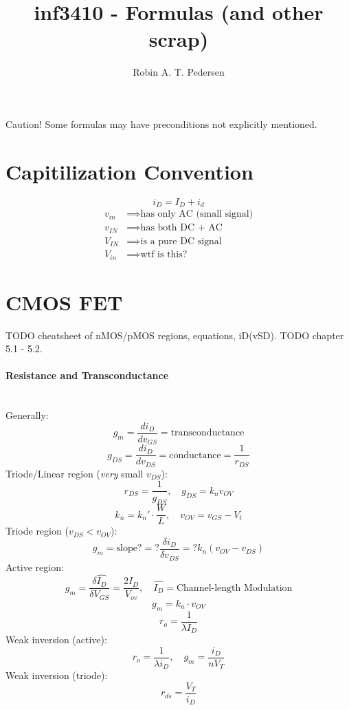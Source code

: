 \documentclass[twocolumn]{article}
\begin{document}
  \title{inf3410 - Formulas (and other scrap)}
  \author{Robin A. T. Pedersen}
  \maketitle

  Caution! Some formulas may have preconditions not explicitly mentioned.

  \section{Capitilization Convention}
    $$i_D = I_D + i_d$$
    \begin{align}
      v_{in} &\implies \text{has only AC (small signal)} \\
      v_{IN} &\implies \text{has both DC + AC} \\
      V_{IN} &\implies \text{is a pure DC signal} \\
      V_{in} &\implies \text{wtf is this?}
    \end{align}

  \section{CMOS FET}
    TODO cheatsheet of nMOS/pMOS regions, equations, iD(vSD).
    TODO chapter 5.1 - 5.2.

    \paragraph{Resistance and Transconductance} \hfill \\
      Generally:
        $$g_m = \frac{d i_D}{d v_{GS}} = \text{transconductance}$$
        $$g_{DS} = \frac{d i_D}{d v_{DS}} = \text{conductance}
          = \frac{1}{r_{DS}}$$
      Triode/Linear region (\emph{very} small $v_{DS}$):
        $$r_{DS} = \frac{1}{g_{DS}}
          ,\quad
          g_{DS} = k_n v_{OV}
          $$
        $$k_n = k_n' \cdot \frac{W}{L}
          ,\quad
          v_{OV} = v_{GS} - V_t
          $$
      Triode region ($v_{DS} < v_{OV}$):
        $$g_m = \text{slope?}
          = ?\frac{\delta i_D}{\delta v_{DS}}
          = ? k_n (v_{OV} - v_{DS})
          $$
      Active region:
        $$g_m = \frac{\delta \hat{I_D}}{\delta V_{GS}} = \frac{2 I_D}{V_{ov}}
          ,\quad \hat{I_D} = \text{Channel-length Modulation}
          $$
        $$g_m = k_n \cdot v_{OV}$$
        $$r_o = \frac{1}{\lambda I_D}$$
      Weak inversion (active):
        $$r_o = \frac{1}{\lambda i_D}
          ,\quad
          g_m = \frac{i_D}{n V_T}
          $$
      Weak inversion (triode):
        $$r_{ds} = \frac{V_T}{i_D}$$
\end{document}
